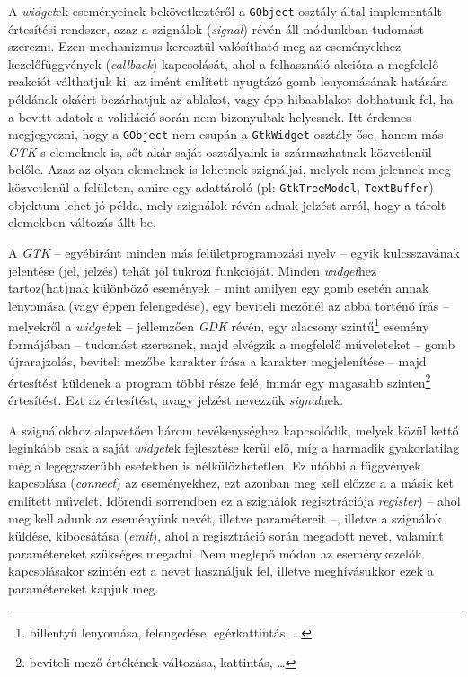 A \textit{widget}ek eseményeinek bekövetkeztéről a \texttt{GObject} osztály által implementált értesítési rendszer, azaz a szignálok (\textit{signal}) révén áll módunkban tudomást szerezni. Ezen mechanizmus keresztül valósítható meg az eseményekhez kezelőfüggvények (\textit{callback}) kapcsolását, ahol a felhasználó akcióra a megfelelő reakciót válthatjuk ki, az imént említett nyugtázó gomb lenyomásának hatására példának okáért bezárhatjuk az ablakot, vagy épp hibaablakot dobhatunk fel, ha a bevitt adatok a validáció során nem bizonyultak helyesnek. Itt érdemes megjegyezni, hogy a \texttt{GObject} nem csupán a \texttt{GtkWidget} osztály őse, hanem más \textit{GTK}-s elemeknek is, sőt akár saját osztályaink is származhatnak közvetlenül belőle. Azaz az olyan elemeknek is lehetnek szignáljai, melyek nem jelennek meg közvetlenül a felületen, amire egy adattároló (pl: \texttt{GtkTreeModel}, \texttt{TextBuffer}) objektum lehet jó példa, mely szignálok révén adnak jelzést arról, hogy a tárolt elemekben változás állt be.

A \textit{GTK} -- egyébiránt minden más felületprogramozási nyelv -- egyik kulcsszavának jelentése (jel, jelzés) tehát jól tükrözi funkcióját. Minden \textit{widget}hez tartoz(hat)nak különböző események -- mint amilyen egy gomb esetén annak lenyomása (vagy éppen felengedése), egy beviteli mezőnél az abba történő írás -- melyekről a \textit{widget}ek -- jellemzően \textit{GDK} révén, egy alacsony szintű\footnote{billentyű lenyomása, felengedése, egérkattintás, \dots} esemény formájában -- tudomást szereznek, majd elvégzik a megfelelő műveleteket -- gomb újrarajzolás, beviteli mezőbe karakter írása a karakter megjelenítése -- majd értesítést küldenek a program többi része felé, immár egy magasabb szinten\footnote{beviteli mező értékének változása, kattintás, \dots} értesítést. Ezt az értesítést, avagy jelzést nevezzük \textit{signal}nek.

A szignálokhoz alapvetően három tevékenységhez kapcsolódik, melyek közül kettő leginkább csak a saját \textit{widget}ek fejlesztése kerül elő, míg a harmadik gyakorlatilag még a legegyszerűbb esetekben is nélkülözhetetlen. Ez utóbbi a függvények kapcsolása (\textit{connect}) az eseményekhez, ezt azonban meg kell előzze a a másik két említett művelet. Időrendi sorrendben ez a szignálok regisztrációja \textit{register}) -- ahol meg kell adunk az eseményünk nevét, illetve paramétereit --, illetve a szignálok küldése, kibocsátása (\textit{emit}), ahol a regisztráció során megadott nevet, valamint paramétereket szükséges megadni. Nem meglepő módon az eseménykezelők kapcsolásakor szintén ezt a nevet használjuk fel, illetve meghívásukkor ezek a paramétereket kapjuk meg.

